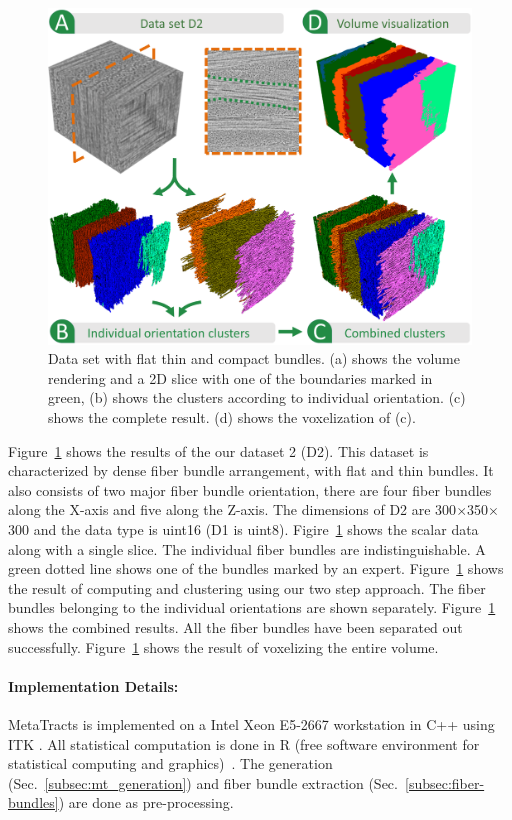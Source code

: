 \begin{figure}[htb]
	\centering
	\includegraphics[width=\linewidth]{images/dataset2.eps}
	\caption{Data set with flat thin and compact bundles. (a) shows the volume rendering and a 2D slice with one of the boundaries marked in green, (b) shows the clusters according to individual orientation. (c) shows the complete result. (d) shows the voxelization of (c).}
	\label{fig:prepreg}
\end{figure}
Figure~\ref{fig:prepreg} shows the results of the our dataset 2 (D2). This dataset is characterized by dense fiber bundle arrangement, with flat and thin bundles. 
It also consists of two major fiber bundle orientation, there are four fiber bundles along the X-axis and five along the Z-axis. The dimensions of D2 are 300$\times$350$\times$300 and the data type is uint16 (D1 is uint8). Figire~\ref{fig:prepreg} shows the scalar data along with a single slice. The individual fiber bundles are indistinguishable. A green dotted line shows one of the bundles marked by an expert. 
Figure~\ref{fig:prepreg} shows the result of computing \mt and clustering using our two step approach. The fiber bundles belonging to the individual orientations are shown separately.
Figure~\ref{fig:prepreg} shows the combined results. All the fiber bundles have been separated out successfully. Figure~\ref{fig:prepreg} shows the result of voxelizing the entire volume. 
\paragraph{Implementation Details:}MetaTracts is implemented on a Intel Xeon E5-2667 workstation in C++ using ITK \cite{Ibanez2005}. All statistical computation is done in R (free software environment for statistical computing and graphics)~\cite{RCT2013}. The \mt generation (Sec.~\ref{subsec:mt_generation}) and fiber bundle extraction (Sec.~\ref{subsec:fiber-bundles}) are done as pre-processing. 